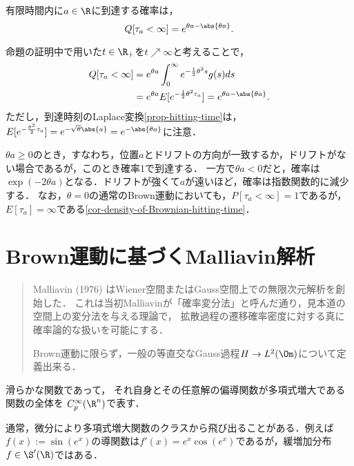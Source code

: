 \documentclass[uplatex,dvipdfmx]{jsreport}
\begin{document}
\begin{corollary}
    有限時間内に$a\in\R$に到達する確率は，
    \[Q[\tau_a<\infty]=e^{\theta a-\abs{\theta a}}.\]
\end{corollary}
\begin{Proof}
    命題の証明中で用いた$t\in\R_+$を$t\nearrow\infty$と考えることで，
    \begin{align*}
        Q[\tau_a<\infty]&=e^{\theta a}\int^\infty_0e^{-\frac{1}{2}\theta^2s}g(s)ds\\
        &=e^{\theta a}E[e^{-\frac{1}{2}\theta^2\tau_a}]=e^{\theta a-\abs{\theta a}}.
    \end{align*}
    ただし，到達時刻のLaplace変換\ref{prop-hitting-time}は，
    $E[e^{-\frac{\theta^2}{2}\tau_a}]=e^{-\sqrt{\theta}\abs{a}}=e^{-\abs{\theta a}}$に注意．
\end{Proof}
\begin{remarks}
    $\theta a\ge0$のとき，すなわち，位置$a$とドリフトの方向が一致するか，ドリフトがない場合であるが，このとき確率1で到達する．
    一方で$\theta a<0$だと，確率は$\exp(-2\theta a)$となる．ドリフトが強くて$a$が遠いほど，確率は指数関数的に減少する．
    なお，$\theta=0$の通常のBrown運動においても，$P[\tau_a<\infty]=1$であるが，$E[\tau_a]=\infty$である\ref{cor-density-of-Brownian-hitting-time}．
\end{remarks}

\chapter{Brown運動に基づくMalliavin解析}

\begin{quotation}
    Malliavin (1976) はWiener空間またはGauss空間上での無限次元解析を創始した．
    これは当初Malliavinが「確率変分法」と呼んだ通り，見本道の空間上の変分法を与える理論で，
    拡散過程の遷移確率密度に対する真に確率論的な扱いを可能にする．

    Brown運動に限らず，一般の等直交なGauss過程$H\to L^2(\Om)$について定義出来る．
\end{quotation}

\begin{notation}
    滑らかな関数であって，
    それ自身とその任意解の偏導関数が多項式増大である関数の全体を
    $C_p^\infty(\R^n)$で表す．
\end{notation}
\begin{remark}
    通常，微分により多項式増大関数のクラスから飛び出ることがある．例えば$f(x):=\sin(e^x)$の導関数は$f'(x)=e^x\cos(e^x)$であるが，緩増加分布$f\in\S'(\R)$ではある．
\end{remark}
\end{document}
